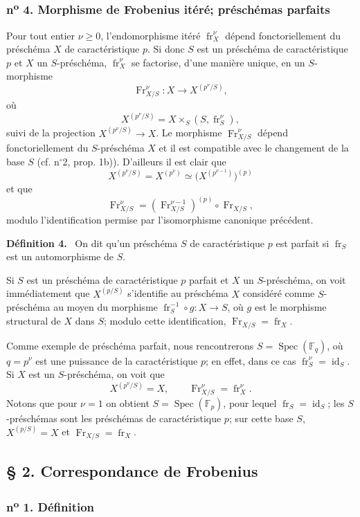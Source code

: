 \documentclass[11pt]{article}
\newenvironment{statement}[1]{\par\medskip\noindent\textbf{#1.}\ }{\par\medskip}
\DeclareMathOperator{\Spec}{Spec}
\providecommand{\id}{\operatorname{id}}
\providecommand{\id}{\operatorname{id}}
\providecommand{\id}{\operatorname{id}}
\providecommand{\id}{\operatorname{id}}
\providecommand{\Spec}{\operatorname{Spec}}
\providecommand{\Spec}{\operatorname{Spec}}
\providecommand{\id}{\operatorname{id}}
\providecommand{\Spec}{\operatorname{Spec}}
\providecommand{\fr}{\operatorname{fr}}
\providecommand{\Fr}{\operatorname{Fr}}
\providecommand{\Fr}{\operatorname{Fr}}
\providecommand{\fr}{\operatorname{fr}}
\providecommand{\Spec}{\operatorname{Spec}}
\providecommand{\id}{\operatorname{id}}
\begin{document}
\subsubsection*{n\textsuperscript{o} 4. Morphisme de Frobenius itéré; préschémas parfaits}

Pour tout entier $\nu\geq 0$, l'endomorphisme itéré $\fr_X^\nu$ dépend fonctoriellement du préschéma $X$ de caractéristique $p$. Si donc $S$ est un préschéma de caractéristique $p$ et $X$ un $S$-préschéma, $\fr_X^\nu$ se factorise, d'une manière unique, en un $S$-morphisme
\[
\Fr_{X/S}^\nu:X\longrightarrow X^{(p^\nu/S)},
\]
où
\[
X^{(p^\nu/S)}=X\times_S(S,\fr_S^\nu),
\]
suivi de la projection $X^{(p^\nu/S)}\to X$. Le morphisme $\Fr_{X/S}^\nu$ dépend fonctoriellement du $S$-préschéma $X$ et il est compatible avec le changement de la base $S$ (cf. n$^\circ$2, prop. 1b)). D'ailleurs il est clair que
\[
X^{(p^\nu/S)}=X^{(p^\nu)}\simeq\bigl(X^{(p^{\nu-1})}\bigr)^{(p)}
\]
et que
\[
\Fr_{X/S}^\nu=(\Fr_{X/S}^{\nu-1})^{(p)}\circ\Fr_{X/S},
\]
modulo l'identification permise par l'isomorphisme canonique précédent.

\begin{statement}{Définition 4}
On dit qu'un préschéma $S$ de caractéristique $p$ est parfait si $\fr_S$ est un automorphisme de $S$.
\end{statement}

Si $S$ est un préschéma de caractéristique $p$ parfait et $X$ un $S$-préschéma, on voit immédiatement que $X^{(p/S)}$ s'identifie au préschéma $X$ considéré comme $S$-préschéma au moyen du morphisme $\fr_S^{-1}\circ g:X\to S$, où $g$ est le morphisme structural de $X$ dans $S$; modulo cette identification, $\Fr_{X/S}=\fr_X$.

Comme exemple de préschéma parfait, nous rencontrerons $S=\Spec(\mathbb F_q)$, où $q=p^\nu$ est une puissance de la caractéristique $p$; en effet, dans ce cas $\fr_S^\nu=\id_S$. Si $X$ est un $S$-préschéma, on voit que
\[
X^{(p^\nu/S)}=X,
\qquad
\Fr_{X/S}^\nu=\fr_X^\nu.
\]
Notons que pour $\nu=1$ on obtient $S=\Spec(\mathbb F_p)$, pour lequel $\fr_S=\id_S$; les $S$-préschémas sont les préschémas de caractéristique $p$; sur cette base $S$, $X^{(p/S)}=X$ et $\Fr_{X/S}=\fr_X$.

\subsection*{§ 2. Correspondance de Frobenius}

\subsubsection*{n\textsuperscript{o} 1. Définition}
\end{document}
